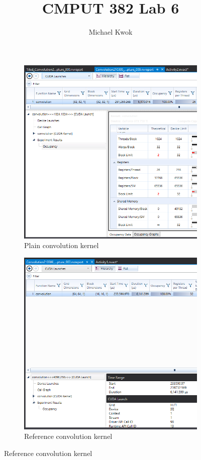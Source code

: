 \documentclass{article}
\title{CMPUT 382 Lab 6}
\author{Michael Kwok}
\begin{document}
\begin{figure}
    \centering
    \begin{subfigure}{0.45\textwidth}
        \includegraphics[width=\textwidth]{Unoptimized.PNG}
        \caption{Plain convolution kernel}
    \end{subfigure}
    \begin{subfigure}{0.45\textwidth}
        \includegraphics[width=\textwidth]{Unoptimized_Ref.PNG}
        \caption{Reference convolution kernel}
    \end{subfigure}
\end{figure}
\end{document}
